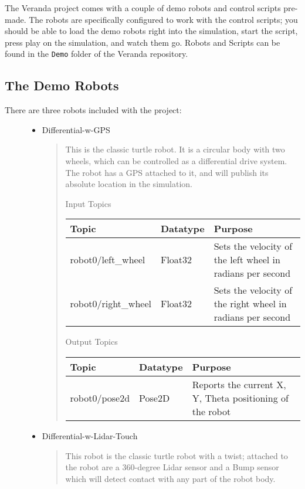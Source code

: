 The Veranda project comes with a couple of demo robots and control
scripts pre-made. The robots are specifically configured to work with
the control scripts; you should be able to load the demo robots right
into the simulation, start the script, press play on the simulation, and
watch them go. Robots and Scripts can be found in the \texttt{Demo}
folder of the Veranda repository.

\hypertarget{the-demo-robots}{%
\subsection{The Demo Robots}\label{the-demo-robots}}

\begin{description}
\item[There are three robots included with the project:]
\begin{itemize}
\item
  Differential-w-GPS

  \begin{quote}
  This is the classic turtle robot. It is a circular body with two
  wheels, which can be controlled as a differential drive system. The
  robot has a GPS attached to it, and will publish its absolute location
  in the simulation.

  Input Topics

  \begin{longtable}[]{@{}lll@{}}
  \toprule
  Topic & Datatype & Purpose\tabularnewline
  \midrule
  \endhead
  robot0/left\_wheel & Float32 & Sets the velocity of the left wheel in
  radians per second\tabularnewline
  robot0/right\_wheel & Float32 & Sets the velocity of the right wheel
  in radians per second\tabularnewline
  \bottomrule
  \end{longtable}

  Output Topics

  \begin{longtable}[]{@{}lll@{}}
  \toprule
  Topic & Datatype & Purpose\tabularnewline
  \midrule
  \endhead
  robot0/pose2d & Pose2D & Reports the current X, Y, Theta positioning
  of the robot\tabularnewline
  \bottomrule
  \end{longtable}
  \end{quote}
\item
  Differential-w-Lidar-Touch

  \begin{quote}
  This robot is the classic turtle robot with a twist; attached to the
  robot are a 360-degree Lidar sensor and a Bump sensor which will
  detect contact with any part of the robot body.


\end{quote}
\end{itemize}
\end{description}
